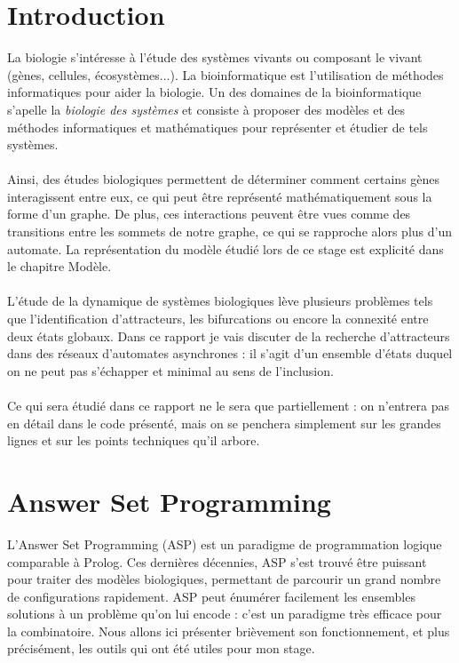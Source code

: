 \documentclass[12pt,a4paper]{article}
\begin{document}
\section{Introduction}
La biologie s'intéresse à l'étude des systèmes vivants ou composant le vivant (gènes, cellules, écosystèmes...). La bioinformatique est l'utilisation de méthodes informatiques pour aider la biologie. Un des domaines de la bioinformatique 
s'apelle la \emph{biologie des systèmes} et consiste à proposer des modèles et des méthodes informatiques et mathématiques pour représenter et étudier de tels systèmes.\\ \\
Ainsi, des études biologiques permettent de déterminer comment certains gènes interagissent entre eux, ce qui peut être représenté mathématiquement sous la forme d'un graphe. De plus, ces interactions peuvent être vues comme des transitions 
entre les sommets de notre graphe, ce qui se rapproche alors plus d'un automate. La représentation du modèle étudié lors de ce stage est explicité dans le chapitre Modèle.\\ \\
L'étude de la dynamique de systèmes biologiques lève plusieurs problèmes tels que l'identification d'attracteurs, les bifurcations ou encore la connexité entre deux états globaux. Dans ce rapport je vais discuter de la recherche d'attracteurs 
dans des réseaux d'automates asynchrones : il s'agit d'un ensemble d'états duquel on ne peut pas s'échapper et minimal au sens de l'inclusion.\\ \\
Ce qui sera étudié dans ce rapport ne le sera que partiellement : on n'entrera pas en détail dans le code présenté, mais on se penchera simplement sur les grandes lignes et sur les points techniques qu'il arbore.

\section{Answer Set Programming}
L'Answer Set Programming (ASP) est un paradigme de programmation logique comparable à Prolog. Ces dernières décennies, ASP s'est trouvé être puissant pour traiter des modèles biologiques, permettant de parcourir un 
grand nombre de configurations rapidement. ASP peut énumérer facilement les ensembles solutions à un problème qu'on lui encode : c'est un paradigme très efficace pour la combinatoire. Nous allons ici présenter brièvement 
son fonctionnement, et plus précisément, les outils qui ont été utiles pour mon stage.
\end{document}
